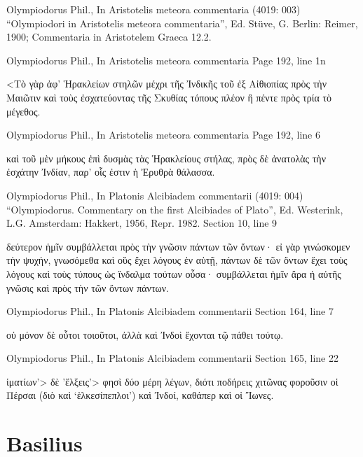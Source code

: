 \documentclass[12pt,letterpaper,twoside,final]{memoir}
\begin{document}
\begin{greek}

Olympiodorus Phil., In Aristotelis meteora commentaria (4019: 003)
“Olympiodori in Aristotelis meteora commentaria”, Ed. Stüve, G.
Berlin: Reimer, 1900; Commentaria in Aristotelem Graeca 12.2.


Olympiodorus Phil., In Aristotelis meteora commentaria 
Page 192, line 1n

<Τὸ γὰρ ἀφ' Ἡρακλείων στηλῶν μέχρι τῆς Ἰνδικῆς τοῦ 
ἐξ Αἰθιοπίας πρὸς τὴν Μαιῶτιν καὶ τοὺς ἐσχατεύοντας τῆς 
 Σκυθίας τόπους πλέον ἢ πέντε πρὸς τρία τὸ μέγεθος. 




Olympiodorus Phil., In Aristotelis meteora commentaria 
Page 192, line 6

        καὶ τοῦ μὲν μήκους ἐπὶ δυσμὰς τὰς Ἡρακλείους στήλας, πρὸς δὲ 
ἀνατολὰς τὴν ἐσχάτην Ἰνδίαν, παρ' οἷς ἐστιν ἡ Ἐρυθρὰ θάλασσα. 



Olympiodorus Phil., In Platonis Alcibiadem commentarii (4019: 004)
“Olympiodorus. Commentary on the first Alcibiades of Plato”, Ed. Westerink, L.G.
Amsterdam: Hakkert, 1956, Repr. 1982.
Section 10, line 9

          δεύτερον ἡμῖν συμβάλλεται πρὸς τὴν γνῶσιν πάντων τῶν ὄντων· 
εἰ γὰρ γινώσκομεν τὴν ψυχήν, γνωσόμεθα καὶ οὓς ἔχει λόγους ἐν αὑτῇ, 
πάντων δὲ τῶν ὄντων ἔχει τοὺς λόγους καὶ τοὺς τύπους ὡς ἴνδαλμα 
τούτων οὖσα· συμβάλλεται ἡμῖν ἄρα ἡ αὐτῆς γνῶσις καὶ πρὸς τὴν τῶν 
ὄντων πάντων. 



Olympiodorus Phil., In Platonis Alcibiadem commentarii 
Section 164, line 7

                                                                 οὐ μόνον δὲ 
οὗτοι τοιοῦτοι, ἀλλὰ καὶ Ἰνδοὶ ἔχονται τῷ πάθει τούτῳ. 



Olympiodorus Phil., In Platonis Alcibiadem commentarii 
Section 165, line 22

                                                              ἱματίων’> δὲ 
’ἕλξεις’> φησὶ δύο μέρη λέγων, διότι ποδήρεις χιτῶνας φοροῦσιν οἱ 
Πέρσαι (διὸ καὶ ‘ἑλκεσίπεπλοι’) καὶ Ἰνδοί, καθάπερ καὶ οἱ Ἴωνες. 


\end{greek}


\section{Basilius}
\end{document}
